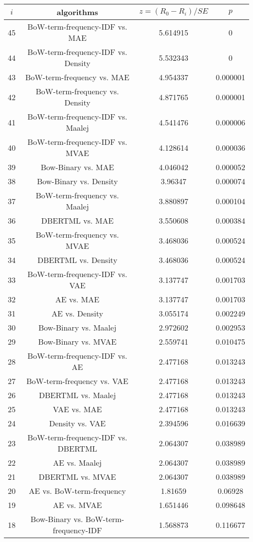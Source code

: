 \documentclass[a4paper,10pt]{article}
\begin{document}
\begin{landscape}
\begin{table}[!htp]
\centering\scriptsize
\begin{tabular}{cccc}
$i$&algorithms&$z=(R_0 - R_i)/SE$&$p$\\
\hline45&BoW-term-frequency-IDF vs. MAE&5.614915&0\\
44&BoW-term-frequency-IDF vs. Density&5.532343&0\\
43&BoW-term-frequency vs. MAE&4.954337&0.000001\\
42&BoW-term-frequency vs. Density&4.871765&0.000001\\
41&BoW-term-frequency-IDF vs. Maalej&4.541476&0.000006\\
40&BoW-term-frequency-IDF vs. MVAE&4.128614&0.000036\\
39&Bow-Binary vs. MAE&4.046042&0.000052\\
38&Bow-Binary vs. Density&3.96347&0.000074\\
37&BoW-term-frequency vs. Maalej&3.880897&0.000104\\
36&DBERTML vs. MAE&3.550608&0.000384\\
35&BoW-term-frequency vs. MVAE&3.468036&0.000524\\
34&DBERTML vs. Density&3.468036&0.000524\\
33&BoW-term-frequency-IDF vs. VAE&3.137747&0.001703\\
32&AE vs. MAE&3.137747&0.001703\\
31&AE vs. Density&3.055174&0.002249\\
30&Bow-Binary vs. Maalej&2.972602&0.002953\\
29&Bow-Binary vs. MVAE&2.559741&0.010475\\
28&BoW-term-frequency-IDF vs. AE&2.477168&0.013243\\
27&BoW-term-frequency vs. VAE&2.477168&0.013243\\
26&DBERTML vs. Maalej&2.477168&0.013243\\
25&VAE vs. MAE&2.477168&0.013243\\
24&Density vs. VAE&2.394596&0.016639\\
23&BoW-term-frequency-IDF vs. DBERTML&2.064307&0.038989\\
22&AE vs. Maalej&2.064307&0.038989\\
21&DBERTML vs. MVAE&2.064307&0.038989\\
20&AE vs. BoW-term-frequency&1.81659&0.06928\\
19&AE vs. MVAE&1.651446&0.098648\\
18&Bow-Binary vs. BoW-term-frequency-IDF&1.568873&0.116677\\

\end{tabular}
\end{table}
\end{landscape}
\end{document}
